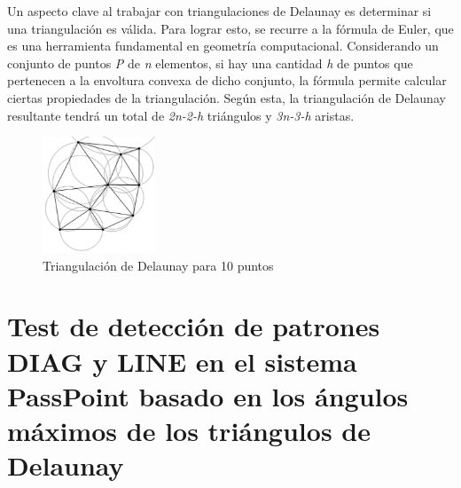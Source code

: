 \documentclass[12pt]{report}
\begin{document}
	
	Un aspecto clave al trabajar con triangulaciones de Delaunay es determinar si una triangulación es válida. Para lograr esto, se recurre a la fórmula de Euler, que es una herramienta fundamental en geometría computacional. Considerando un conjunto de puntos \textit{P} de \textit{n} elementos, si hay una cantidad \textit{h} de puntos que pertenecen a la envoltura convexa de dicho conjunto, la fórmula permite calcular ciertas propiedades de la triangulación. Según esta, la triangulación de Delaunay resultante tendrá un total de \textit{2n-2-h} triángulos y \textit{3n-3-h} aristas. \cite{29}
	
	\begin{figure}[ht]
		\centering
		\includegraphics[width=0.3\textwidth]{td_10pts.png}
		\caption{Triangulación de Delaunay para 10 puntos}
		\label{fig:Triangulación de Delaunay para 10 puntos}
	\end{figure}
	
\section{Test de detección de patrones DIAG y LINE en el sistema PassPoint basado en los ángulos máximos de los triángulos de Delaunay  }


\end{document}
